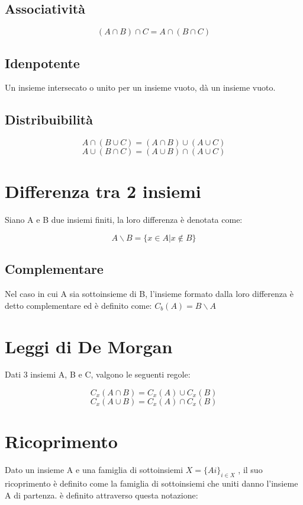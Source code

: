 \documentclass[a4paper, 10pt]{article}
\begin{document}
\subsection{Associatività}
$$ (A \cap B) \cap C = A \cap (B \cap C) $$

\subsection{Idenpotente}
Un insieme intersecato o unito per un insieme vuoto, dà un insieme vuoto.

\subsection{Distribuibilità}
$$ A \cap (B \cup C) = (A \cap B) \cup (A \cup C) $$
$$ A \cup (B \cap C) = (A \cup B) \cap (A \cup C) $$

\section{Differenza tra 2 insiemi}

Siano A e B due insiemi finiti, la loro differenza è denotata come: 

$$ A \backslash B = \{x \in A | x \notin B\} $$

\subsection{Complementare}

Nel caso in cui A sia sottoinsieme di B, l'insieme formato dalla loro differenza è detto complementare ed è definito come: $ C_b(A) = B \backslash A $
\section{Leggi di De Morgan}

Dati 3 insiemi A, B e C, valgono le seguenti regole:

$$ C_x(A \cap B) = C_x(A) \cup C_x(B) $$
$$ C_x(A \cup B) = C_x(A) \cap C_x(B) $$

\section{Ricoprimento}

Dato un insieme A e una famiglia di sottoinsiemi $ X = \{Ai\}_{i \in X} $ , il suo ricoprimento è definito come la famiglia di sottoinsiemi che uniti danno l'insieme A di partenza. è definito attraverso questa notazione:
\end{document}
